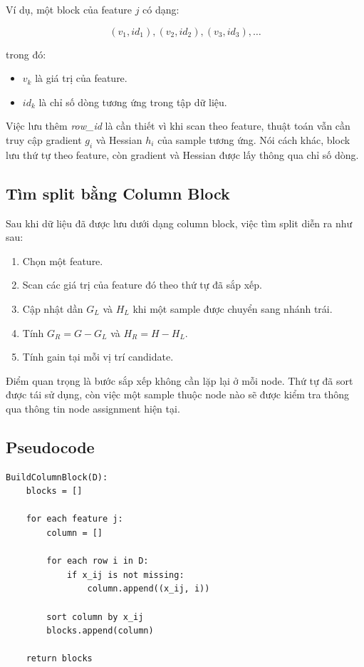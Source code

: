 Ví dụ, một block của feature $j$ có dạng:

\[
(v_1, id_1), (v_2, id_2), (v_3, id_3), \ldots
\]

trong đó:

\begin{itemize}
    \item $v_k$ là giá trị của feature.
    \item $id_k$ là chỉ số dòng tương ứng trong tập dữ liệu.
\end{itemize}

Việc lưu thêm \textit{row\_id} là cần thiết vì khi scan theo feature, thuật toán vẫn cần truy cập gradient $g_i$ và Hessian $h_i$ của sample tương ứng. Nói cách khác, block lưu thứ tự theo feature, còn gradient và Hessian được lấy thông qua chỉ số dòng.

\subsection{Tìm split bằng Column Block}

Sau khi dữ liệu đã được lưu dưới dạng column block, việc tìm split diễn ra như sau:

\begin{enumerate}
    \item Chọn một feature.
    \item Scan các giá trị của feature đó theo thứ tự đã sắp xếp.
    \item Cập nhật dần $G_L$ và $H_L$ khi một sample được chuyển sang nhánh trái.
    \item Tính $G_R = G - G_L$ và $H_R = H - H_L$.
    \item Tính gain tại mỗi vị trí candidate.
\end{enumerate}

Điểm quan trọng là bước sắp xếp không cần lặp lại ở mỗi node. Thứ tự đã sort được tái sử dụng, còn việc một sample thuộc node nào sẽ được kiểm tra thông qua thông tin node assignment hiện tại.

\subsection{Pseudocode}

\begin{lstlisting}[style=pseudocode, caption={Xây dựng Column Block}, label={lst:build_column_block}]
BuildColumnBlock(D):
    blocks = []

    for each feature j:
        column = []

        for each row i in D:
            if x_ij is not missing:
                column.append((x_ij, i))

        sort column by x_ij
        blocks.append(column)

    return blocks
\end{lstlisting}

